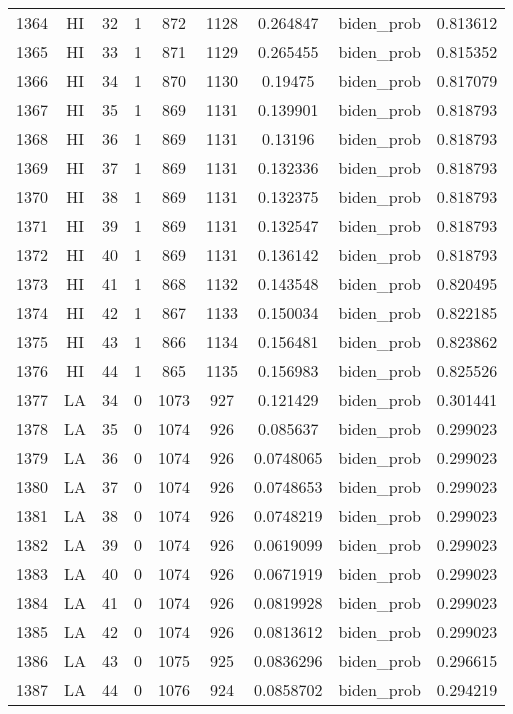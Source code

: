\documentclass[12pt,a4paper]{article}
\begin{document}
\begin{tabular}{r|cccccccc}
	1364 & HI & 32 & 1 & 872 & 1128 & 0.264847 & biden\_prob & 0.813612 \\
	1365 & HI & 33 & 1 & 871 & 1129 & 0.265455 & biden\_prob & 0.815352 \\
	1366 & HI & 34 & 1 & 870 & 1130 & 0.19475 & biden\_prob & 0.817079 \\
	1367 & HI & 35 & 1 & 869 & 1131 & 0.139901 & biden\_prob & 0.818793 \\
	1368 & HI & 36 & 1 & 869 & 1131 & 0.13196 & biden\_prob & 0.818793 \\
	1369 & HI & 37 & 1 & 869 & 1131 & 0.132336 & biden\_prob & 0.818793 \\
	1370 & HI & 38 & 1 & 869 & 1131 & 0.132375 & biden\_prob & 0.818793 \\
	1371 & HI & 39 & 1 & 869 & 1131 & 0.132547 & biden\_prob & 0.818793 \\
	1372 & HI & 40 & 1 & 869 & 1131 & 0.136142 & biden\_prob & 0.818793 \\
	1373 & HI & 41 & 1 & 868 & 1132 & 0.143548 & biden\_prob & 0.820495 \\
	1374 & HI & 42 & 1 & 867 & 1133 & 0.150034 & biden\_prob & 0.822185 \\
	1375 & HI & 43 & 1 & 866 & 1134 & 0.156481 & biden\_prob & 0.823862 \\
	1376 & HI & 44 & 1 & 865 & 1135 & 0.156983 & biden\_prob & 0.825526 \\
	1377 & LA & 34 & 0 & 1073 & 927 & 0.121429 & biden\_prob & 0.301441 \\
	1378 & LA & 35 & 0 & 1074 & 926 & 0.085637 & biden\_prob & 0.299023 \\
	1379 & LA & 36 & 0 & 1074 & 926 & 0.0748065 & biden\_prob & 0.299023 \\
	1380 & LA & 37 & 0 & 1074 & 926 & 0.0748653 & biden\_prob & 0.299023 \\
	1381 & LA & 38 & 0 & 1074 & 926 & 0.0748219 & biden\_prob & 0.299023 \\
	1382 & LA & 39 & 0 & 1074 & 926 & 0.0619099 & biden\_prob & 0.299023 \\
	1383 & LA & 40 & 0 & 1074 & 926 & 0.0671919 & biden\_prob & 0.299023 \\
	1384 & LA & 41 & 0 & 1074 & 926 & 0.0819928 & biden\_prob & 0.299023 \\
	1385 & LA & 42 & 0 & 1074 & 926 & 0.0813612 & biden\_prob & 0.299023 \\
	1386 & LA & 43 & 0 & 1075 & 925 & 0.0836296 & biden\_prob & 0.296615 \\
	1387 & LA & 44 & 0 & 1076 & 924 & 0.0858702 & biden\_prob & 0.294219 \\

\end{tabular}
\end{document}
